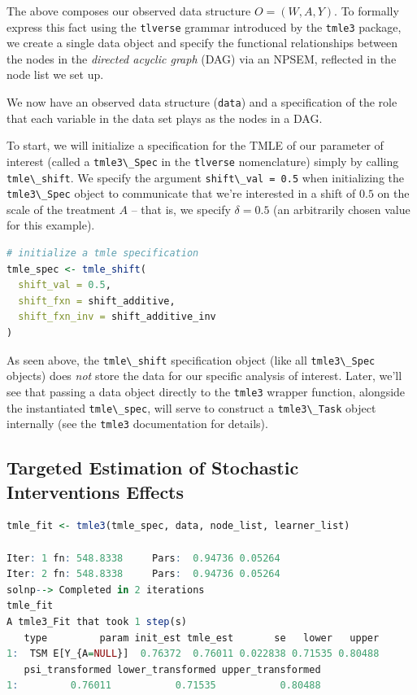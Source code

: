 \documentclass[
  12pt, krantz2,
]{krantz}
\newcommand{\passthrough}[1]{#1}
\theoremstyle{definition}
\theoremstyle{definition}
\theoremstyle{definition}
\newcommand{\1}{\mathbbm{1}}
\begin{document}
The above composes our observed data structure \(O = (W, A, Y)\). To formally
express this fact using the \passthrough{\lstinline!tlverse!} grammar introduced by the \passthrough{\lstinline!tmle3!} package,
we create a single data object and specify the functional relationships between
the nodes in the \emph{directed acyclic graph} (DAG) via an NPSEM, reflected in the
node list we set up.

We now have an observed data structure (\passthrough{\lstinline!data!}) and a specification of the role
that each variable in the data set plays as the nodes in a DAG.

To start, we will initialize a specification for the TMLE of our parameter of
interest (called a \passthrough{\lstinline!tmle3\_Spec!} in the \passthrough{\lstinline!tlverse!} nomenclature) simply by calling
\passthrough{\lstinline!tmle\_shift!}. We specify the argument \passthrough{\lstinline!shift\_val = 0.5!} when initializing the
\passthrough{\lstinline!tmle3\_Spec!} object to communicate that we're interested in a shift of \(0.5\) on
the scale of the treatment \(A\) -- that is, we specify \(\delta = 0.5\) (an
arbitrarily chosen value for this example).

\begin{lstlisting}[language=R]
# initialize a tmle specification
tmle_spec <- tmle_shift(
  shift_val = 0.5,
  shift_fxn = shift_additive,
  shift_fxn_inv = shift_additive_inv
)
\end{lstlisting}

As seen above, the \passthrough{\lstinline!tmle\_shift!} specification object (like all \passthrough{\lstinline!tmle3\_Spec!}
objects) does \emph{not} store the data for our specific analysis of interest. Later,
we'll see that passing a data object directly to the \passthrough{\lstinline!tmle3!} wrapper function,
alongside the instantiated \passthrough{\lstinline!tmle\_spec!}, will serve to construct a \passthrough{\lstinline!tmle3\_Task!}
object internally (see the \passthrough{\lstinline!tmle3!} documentation for details).

\hypertarget{targeted-estimation-of-stochastic-interventions-effects}{%
\subsection{Targeted Estimation of Stochastic Interventions Effects}\label{targeted-estimation-of-stochastic-interventions-effects}}

\begin{lstlisting}[language=R]
tmle_fit <- tmle3(tmle_spec, data, node_list, learner_list)

Iter: 1 fn: 548.8338     Pars:  0.94736 0.05264
Iter: 2 fn: 548.8338     Pars:  0.94736 0.05264
solnp--> Completed in 2 iterations
tmle_fit
A tmle3_Fit that took 1 step(s)
   type         param init_est tmle_est       se   lower   upper
1:  TSM E[Y_{A=NULL}]  0.76372  0.76011 0.022838 0.71535 0.80488
   psi_transformed lower_transformed upper_transformed
1:         0.76011           0.71535           0.80488
\end{lstlisting}
\end{document}
